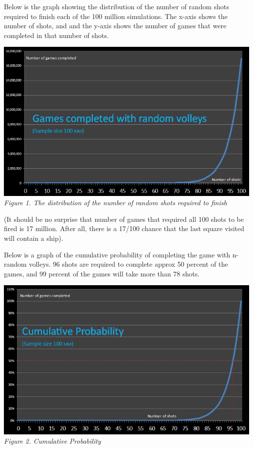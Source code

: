 \documentclass{article}
\begin{document}
\begin{multicols}{2}
Below is the graph showing the distribution of the number of random shots required to finish each of the 100 million simulations. The x-axis shows the number of shots, and and the y-axis shows the number of games that were completed in that number of shots.

\begin{center}
\includegraphics[scale=.35]{random}
\textit{Figure 1. The distribution of the number of random shots required to finish}
\end{center}

(It should be no surprise that number of games that required all 100 shots to be fired is 17 million. After all, there is a 17/100 chance that the last square visited will contain a ship).

Below is a graph of the cumulative probability of completing the game with n-random volleys. 96 shots are required to complete approx 50 percent of the games, and 99 percent of the games will take more than 78 shots.
\begin{center}
\includegraphics[scale=.35]{cumulative}
\textit{Figure 2. Cumulative Probability}
\end{center}


\end{multicols}
\end{document}
